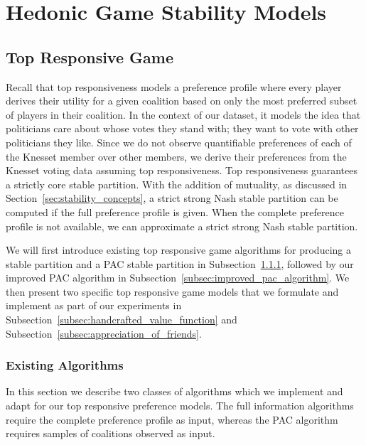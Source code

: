 
\chapter{Hedonic Game Stability Models}
\label{ch:hedonic}
\vspace{2em}

\section{Top Responsive Game}
\label{sec:top_responsive_game}
Recall that top responsiveness models a preference profile where every player
derives their utility for a given coalition based on only the most preferred
subset of players in their coalition.
In the context of our dataset, it models the idea that politicians care about
whose votes they stand with; they want to vote with other politicians they like.
Since we do not observe quantifiable preferences of each of the Knesset member
over other members, we derive their preferences from the Knesset voting data
assuming top responsiveness.
Top responsiveness guarantees a strictly core stable partition.
With the addition of mutuality, as discussed in Section~\ref{sec:stability_concepts},
a strict strong Nash stable partition can be computed if the full preference
profile is given.
When the complete preference profile is not available, we can approximate
a strict strong Nash stable partition.

We will first introduce existing top responsive game algorithms for producing a
stable partition and a PAC stable partition in Subsection~\ref{subsec:algorithms},
followed by our improved PAC algorithm in
Subsection~\ref{subsec:improved_pac_algorithm}.
We then present two specific top responsive game models that we formulate and
implement as part of our experiments in
Subsection~\ref{subsec:handcrafted_value_function} and
Subsection~\ref{subsec:appreciation_of_friends}.

\subsection{Existing Algorithms}
\label{subsec:algorithms}
In this section we describe two classes of algorithms which we implement and adapt
for our top responsive preference models.
The full information algorithms require the complete preference profile as
input, whereas the PAC algorithm requires samples of coalitions observed as input.

